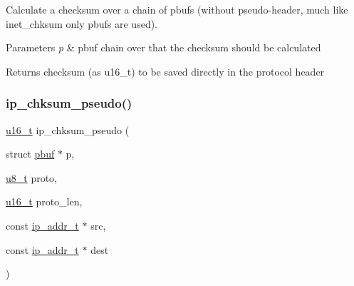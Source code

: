 Calculate a checksum over a chain of pbufs (without pseudo-\/header, much like inet\+\_\+chksum only pbufs are used).


\begin{DoxyParams}{Parameters}
{\em p} & pbuf chain over that the checksum should be calculated \\
\hline
\end{DoxyParams}
\begin{DoxyReturn}{Returns}
checksum (as u16\+\_\+t) to be saved directly in the protocol header 
\end{DoxyReturn}
\mbox{\label{openmote-cc2538_2lwip_2src_2core_2inet__chksum_8c_aa13cda42e7c262f5dee243ff6c28422f}} 
\subsubsection{\texorpdfstring{ip\+\_\+chksum\+\_\+pseudo()}{ip\_chksum\_pseudo()}}
{\footnotesize\ttfamily \hyperlink{group__compiler__abstraction_ga77570ac4fcab86864fa1916e55676da2}{u16\+\_\+t} ip\+\_\+chksum\+\_\+pseudo (\begin{DoxyParamCaption}\item[{struct \hyperlink{structpbuf}{pbuf} $\ast$}]{p,  }\item[{\hyperlink{group__compiler__abstraction_ga4caecabca98b43919dd11be1c0d4cd8e}{u8\+\_\+t}}]{proto,  }\item[{\hyperlink{group__compiler__abstraction_ga77570ac4fcab86864fa1916e55676da2}{u16\+\_\+t}}]{proto\+\_\+len,  }\item[{const \hyperlink{native_2lwip_2src_2include_2lwip_2ip__addr_8h_a88b43639738c4de2d3cd22e3a1fd7696}{ip\+\_\+addr\+\_\+t} $\ast$}]{src,  }\item[{const \hyperlink{native_2lwip_2src_2include_2lwip_2ip__addr_8h_a88b43639738c4de2d3cd22e3a1fd7696}{ip\+\_\+addr\+\_\+t} $\ast$}]{dest }\end{DoxyParamCaption})}

\mbox{\label{openmote-cc2538_2lwip_2src_2core_2inet__chksum_8c_acfe7ab6c63ef998210c66bb4822b03b2}} 
